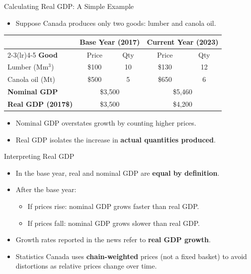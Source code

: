 \documentclass[aspectratio=169]{beamer}
\begin{document}
\begin{frame}{Calculating Real GDP: A Simple Example}
\transfade
\small
\begin{itemize}[<+->]
  \item Suppose Canada produces only two goods: lumber and canola oil.
\end{itemize}
\vspace{0.3em}
\renewcommand{\arraystretch}{1.3}
\begin{tabular}{lcccc}
\toprule
 & \multicolumn{2}{c}{\textbf{Base Year (2017)}} & \multicolumn{2}{c}{\textbf{Current Year (2023)}} \\
\cmidrule(lr){2-3}\cmidrule(lr){4-5}
\textbf{Good} & Price & Qty & Price & Qty \\
\midrule
Lumber (M$\text{m}^3$) & \$100 & 10 & \$130 & 12 \\
Canola oil (Mt) & \$500 & 5 & \$650 & 6 \\
\midrule
\textbf{Nominal GDP} & \multicolumn{2}{c}{\$3,500} & \multicolumn{2}{c}{\textcolor{canadared}{\$5,460}} \\
\textbf{Real GDP (2017\$)} & \multicolumn{2}{c}{\$3,500} & \multicolumn{2}{c}{\textcolor{accent}{\$4,200}} \\
\bottomrule
\end{tabular}
\begin{itemize}[<+->]
  \item Nominal GDP overstates growth by counting higher prices.
  \item Real GDP isolates the increase in \textbf{actual quantities produced}.
\end{itemize}
\end{frame}

\begin{frame}{Interpreting Real GDP}
\transfade
\begin{itemize}[<+->]
  \item In the base year, real and nominal GDP are \textbf{equal by definition}.
  \item After the base year:
  \begin{itemize}[<+->]
    \item If prices rise: nominal GDP grows \alert{faster} than real GDP.
    \item If prices fall: nominal GDP grows \alert{slower} than real GDP.
  \end{itemize}
  \item Growth rates reported in the news refer to \textbf{real GDP growth}.
  \item Statistics Canada uses \textbf{chain-weighted} prices (not a fixed basket) to avoid distortions as relative prices change over time.
\end{itemize}
\end{frame}
\end{document}
